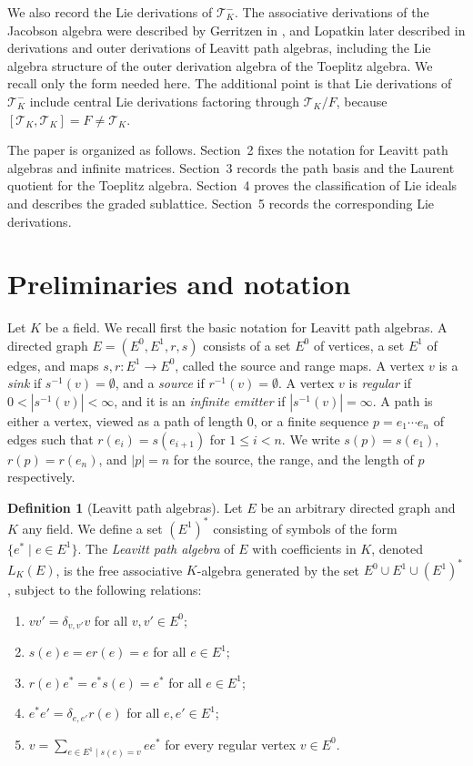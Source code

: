 \documentclass[11pt]{article}
\numberwithin{equation}{section}
\theoremstyle{plain}
\theoremstyle{definition}
\newtheorem{definition}[theorem]{Definition}
\numberwithin{equation}{section}
\newcommand{\T}{\mathscr T_K}
\begin{document}
We also record the Lie derivations of $\T^-$. The associative derivations of the Jacobson algebra were described by Gerritzen in \cite{Gerritzen2000}, and Lopatkin later described in \cite{Lopatkin2019} derivations and outer derivations of Leavitt path algebras, including the Lie algebra structure of the outer derivation algebra of the Toeplitz algebra. We recall only the form needed here. The additional point is that Lie derivations of $\T^-$ include central Lie derivations factoring through $\T/F$, because $[\T,\T]=F\neq\T$.

The paper is organized as follows. Section~2 fixes the notation for Leavitt path algebras and infinite matrices. Section~3 records the path basis and the Laurent quotient for the Toeplitz algebra. Section~4 proves the classification of Lie ideals and describes the graded sublattice. Section~5 records the corresponding Lie derivations.

\section{Preliminaries and notation}

Let $K$ be a field. We recall first the basic notation for Leavitt path algebras. A directed graph $E=(E^0,E^1,r,s)$ consists of a set $E^0$ of vertices, a set $E^1$ of edges, and maps $s,r:E^1\to E^0$, called the source and range maps. A vertex $v$ is a \textit{sink} if $s^{-1}(v)=\emptyset$, and a \textit{source} if $r^{-1}(v)=\emptyset$. A vertex $v$ is \textit{regular} if $0<|s^{-1}(v)|<\infty$, and it is an \textit{infinite emitter} if $|s^{-1}(v)|=\infty$. A path is either a vertex, viewed as a path of length $0$, or a finite sequence $p=e_1\cdots e_n$ of edges such that $r(e_i)=s(e_{i+1})$ for $1\leq i<n$. We write $s(p)=s(e_1)$, $r(p)=r(e_n)$, and $|p|=n$ for the source, the range, and the length of $p$ respectively.

\begin{definition}[Leavitt path algebras]
Let $E$ be an arbitrary directed graph and $K$ any field. We define a set $(E^1)^*$ consisting of symbols of the form $\{e^*\mid e\in E^1\}$. The \emph{Leavitt path algebra} of $E$ with coefficients in $K$, denoted $L_K(E)$, is the free associative $K$-algebra generated by the set $E^0\cup E^1\cup (E^1)^*$, subject to the following relations:
\begin{enumerate}
\item[\rm(V)] $vv'=\delta_{v,v'}v$ for all $v,v'\in E^0$;
\item[\rm(E1)] $s(e)e=er(e)=e$ for all $e\in E^1$;
\item[\rm(E2)] $r(e)e^*=e^*s(e)=e^*$ for all $e\in E^1$;
\item[\rm(CK1)] $e^*e'=\delta_{e,e'}r(e)$ for all $e,e'\in E^1$;
\item[\rm(CK2)] $v=\sum_{{e\in E^1\mid s(e)=v}}ee^*$ for every regular vertex $v\in E^0$.
\end{enumerate}
\end{definition}
\end{document}
